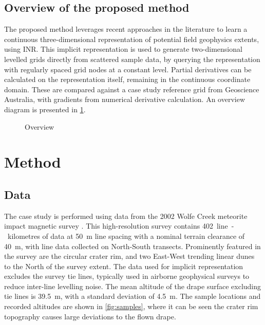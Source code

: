 \documentclass[manuscript.tex]{subfiles}
\begin{document}
\subsection{Overview of the proposed method}
\label{sec:overview}
The proposed method leverages recent approaches in the literature to learn a continuous three-dimensional representation of potential field geophysics extents, using INR\@.
This implicit representation is used to generate two-dimensional levelled grids directly from scattered sample data, by querying the representation with regularly spaced grid nodes at a constant level.
Partial derivatives can be calculated on the representation itself, remaining in the continuous coordinate domain.
These are compared against a case study reference grid from Geoscience Australia, with gradients from numerical derivative calculation.
An overview diagram is presented in \cref{fig:overview}.

\begin{figure}[hbt]
    \centering{}
    \caption[Overview of the proposed method]{Overview}
    \label{fig:overview}
\end{figure}

\section{Method}

\subsection{Data}
The case study is performed using data from the 2002 Wolfe Creek meteorite impact magnetic survey \parencite{wolfecreek2019}.
This high-resolution survey contains \qty{402}{line-kilometres} of data at \SI{50}{\m} line spacing with a nominal terrain clearance of \SI{40}{\m}, with line data collected on North-South transects.
Prominently featured in the survey are the circular crater rim, and two East-West trending linear dunes to the North of the survey extent.
The data used for implicit representation excludes the survey tie lines, typically used in airborne geophysical surveys to reduce inter-line levelling noise.
The mean altitude of the drape surface excluding tie lines is \SI{39.5}{\m}, with a standard deviation of \SI{4.5}{\m}.
The sample locations and recorded altitudes are shown in \cref{fig:samples}, where it can be seen the crater rim topography causes large deviations to the flown drape.
\end{document}
